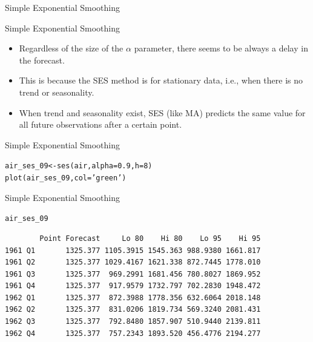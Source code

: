 \documentclass{beamer}\usepackage[]{graphicx}\usepackage[]{color}
\makeatletter
\newcommand{\hlnum}[1]{\textcolor[rgb]{0.824,0.412,0.118}{#1}}%
\newcommand{\hlstr}[1]{\textcolor[rgb]{1,0.894,0.71}{#1}}%
\newcommand{\hlstd}[1]{\textcolor[rgb]{1,0.894,0.769}{#1}}%
\newcommand{\hlkwb}[1]{\textcolor[rgb]{0.804,0.776,0.451}{#1}}%
\newcommand{\hlkwc}[1]{\textcolor[rgb]{0.78,0.941,0.545}{#1}}%
\newcommand{\hlkwd}[1]{\textcolor[rgb]{1,0.78,0.769}{#1}}%
\newenvironment{kframe}{%
 \def\at@end@of@kframe{}%
 \ifinner\ifhmode%
  \def\at@end@of@kframe{\end{minipage}}%
  \begin{minipage}{\columnwidth}%
 \fi\fi%
 \def\FrameCommand##1{\hskip\@totalleftmargin \hskip-\fboxsep
 \colorbox{shadecolor}{##1}\hskip-\fboxsep
     \hskip-\linewidth \hskip-\@totalleftmargin \hskip\columnwidth}%
 \MakeFramed {\advance\hsize-\width
   \@totalleftmargin\z@ \linewidth\hsize
   \@setminipage}}%
 {\par\unskip\endMakeFramed%
 \at@end@of@kframe}
\newenvironment{knitrout}{}{} %
\makeatother
\begin{document}
\begin{darkframes}
\begin{frame}[fragile]{Simple Exponential Smoothing}
\begin{knitrout}
\end{knitrout}
    \end{frame}  
    
    
    \begin{frame}[fragile]{Simple Exponential Smoothing}
      \begin{itemize}[<+->]
        \item Regardless of the size of the $\alpha$ parameter, there seems to be always a delay in the forecast.
        \item This is because the SES method is for stationary data, i.e., when there is no trend or seasonality.
        \item When trend and seasonality exist, SES (like MA) predicts the same value for all future observations after a certain point.
      \end{itemize}
      
    \end{frame} 
    
    
    
    \begin{frame}[fragile]{Simple Exponential Smoothing}
      \fontsize{8}{8}\selectfont
\begin{knitrout}
\begin{kframe}
\begin{alltt}
\hlstd{air_ses_09} \hlkwb{<-} \hlkwd{ses}\hlstd{(air,} \hlkwc{alpha} \hlstd{=} \hlnum{0.9}\hlstd{,} \hlkwc{h}\hlstd{=}\hlnum{8}\hlstd{)}
\hlkwd{plot}\hlstd{(air_ses_09,} \hlkwc{col}\hlstd{=}\hlstr{'green'}\hlstd{)}
\end{alltt}
\end{kframe}


\end{knitrout}
    \end{frame}
    
    \begin{frame}[fragile]{Simple Exponential Smoothing}
      \fontsize{8}{8}\selectfont
\begin{knitrout}
\begin{kframe}
\begin{alltt}
\hlstd{air_ses_09}
\end{alltt}
\begin{verbatim}
        Point Forecast     Lo 80    Hi 80    Lo 95    Hi 95
1961 Q1       1325.377 1105.3915 1545.363 988.9380 1661.817
1961 Q2       1325.377 1029.4167 1621.338 872.7445 1778.010
1961 Q3       1325.377  969.2991 1681.456 780.8027 1869.952
1961 Q4       1325.377  917.9579 1732.797 702.2830 1948.472
1962 Q1       1325.377  872.3988 1778.356 632.6064 2018.148
1962 Q2       1325.377  831.0206 1819.734 569.3240 2081.431
1962 Q3       1325.377  792.8480 1857.907 510.9440 2139.811
1962 Q4       1325.377  757.2343 1893.520 456.4776 2194.277
\end{verbatim}
\end{kframe}
\end{knitrout}
    \end{frame}
    

\end{darkframes}
\end{document}
